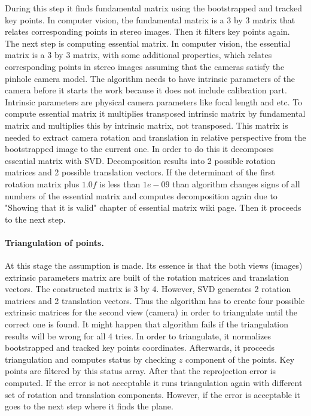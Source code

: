 \documentclass[../../main]{subfiles}
\begin{document}
During this step it finds fundamental matrix using the bootstrapped and tracked key points. In computer vision, the fundamental matrix is a 3 by 3 matrix that relates corresponding points in stereo images. Then it filters key points again. The next step is computing essential matrix. In computer vision, the essential matrix is a 3 by 3 matrix, with some additional properties, which relates corresponding points in stereo images assuming that the cameras satisfy the pinhole camera model. The algorithm needs to have intrinsic parameters of the camera before it starts the work because it does not include calibration part. Intrinsic parameters are physical camera parameters like focal length and etc. To compute essential matrix it multiplies transposed intrinsic matrix by fundamental matrix and multiplies this by intrinsic matrix, not transposed. This matrix is needed to extract camera rotation and translation in relative perspective from the bootstrapped image to the current one. In order to do this it decomposes essential matrix with \ac{SVD}. Decomposition results into 2 possible rotation matrices and 2 possible translation vectors. If the determinant of the first rotation matrix plus $1.0f$ is less than $1e-09$ than algorithm changes signs of all numbers of the essential matrix and computes decomposition again due to "Showing that it is valid" chapter of essential matrix wiki page. Then it proceeds to the next step.

\paragraph*{Triangulation of points.}

At this stage the assumption is made. Its essence is that the both views (images) extrinsic parameters matrix are built of the rotation matrices and translation vectors. The constructed matrix is 3 by 4. However, \ac{SVD} generates 2 rotation matrices and 2 translation vectors. Thus the algorithm has to create four possible extrinsic matrices for the second view (camera) in order to triangulate until the correct one is found. It might happen that algorithm fails if the triangulation results will be wrong for all 4 tries.  In order to triangulate, it normalizes bootstrapped and tracked key points coordinates. Afterwards, it proceeds triangulation and computes status by checking $z$ component of the points. Key points are filtered by this status array. After that the reprojection error is computed. If the error is not acceptable it runs triangulation again with different set of rotation and translation components. However, if the error is acceptable it goes to the next step where it finds the plane.
\end{document}
